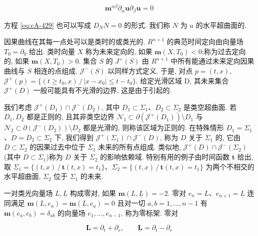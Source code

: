 \begin{equation}
\mathbf{m}^{\alpha\beta}\partial_{\alpha}\mathbf{u}\partial_{\beta}\mathbf{u} = 0\label{eq:cA-429}
\end{equation}

方程 \eqref{eq:cA-429} 也可以写成 $D_{N}N = 0$ 的形式. 我们称 $N$ 为 $u$ 的水平超曲面的.

因果曲线在其每一点处可以是类时的或类光的. $R^{n+1}$ 的典范时间定向由向量场 $T_{0} = \partial_{0}$ 给出. 类时向量 $X$ 称为未来定向的, 如果 $\mathbf{m}(X, T_{0}) < 0$;称为过去定向的, 如果 $\mathbf{m}(X, T_{0}) > 0$. 集合 $S$ 的 $J^{+}(S)$ 由 $R^{n+1}$ 中所有能通过未来定向因果曲线与 $S$ 相连的点组成.  $\mathcal{J}^{-}(S)$ 以同样方式定义. 于是, 对点 $p = (t, x)$, $\mathcal{J}^{+}(p) = \{(t \geq t_{0}, x)\, /\, |x - x_{0}| \leq t - t_{0}\}$. 给定光滑区域 D, 其未来集合 $\mathcal{J}^{+}(D)$ 一般可能具有不光滑的边界, 这是由于引起的.

我们考虑 $\mathcal{J}^{+}(D_{1})\cap\mathcal{J}^{-}(D_{2})$, 其中 $D_{1}\subset\Sigma_{1}$、$D_{2}\subset\Sigma_{2}$ 是类空超曲面. 若 $D_{1}, D_{2}$ 都是正则的, 且其非类空边界 $\mathcal{N}_1\subset\partial(\mathcal{J}^+(D_1))\setminus D_1$ 与 $\mathcal{N}_2\subset\partial(\mathcal{J}^{-}(D_2))\setminus D_2$ 都是光滑的, 则称该区域为正则的. 在特殊情形 $D_{1} = \Sigma_{1}$、$D = D_{2}\subset\Sigma_{2}$ 下, 我们得到 $\mathcal{J}^{+}(\Sigma_{1})\cap\mathcal{J}^{-}(D)$, 称为 $D$ 关于 $\Sigma_{1}$ 的, 它由 $D\subset\Sigma_{2}$ 的因果过去中位于 $\Sigma_{1}$ 未来的所有点组成. 类似地, $\mathcal{J}^{+}(D)\cap\mathcal{J}^{-}(\Sigma_{2})$(其中 $D\subset\Sigma_{1}$)称为 $D$ 关于 $\Sigma_{2}$ 的影响依赖域. 特别有用的例子由时间函数 $\mathbf{t}$ 给出, 取 $\Sigma_1 = \{(t, x)\, /\, \mathbf{t}(t, x) = t_1\}$、$\Sigma_{2} = \{(t, x)\, /\, \mathbf{t}(t, x) = t_{1}\}$ 为两个不相交的水平超曲面, $\Sigma_{2}$ 位于 $\Sigma_{1}$ 的未来.

一对类光向量场 $L, \underline{L}$ 构成零对, 如果 $\mathbf{m}(L, \underline{L}) = -2$. 零对 $e_n = L$、$e_{n+1} = \underline{L}$ 连同满足 $\mathbf{m}(L, e_a) = \mathbf{m}(\underline{L}, e_a) = 0$ 且对一切 $a, b = 1, \ldots, n-1$ 有 $\mathbf{m}(e_a, e_b) = \delta_{ab}$ 的向量场 $e_1, \ldots, e_{n-1}$, 称为零标架. 零对

\begin{equation}
\mathbf{L} = \partial_{t} + \partial_{r}, \qquad \underline{\mathbf{L}} = \partial_{t} - \partial_{r}\label{eq:cA-430}
\end{equation}

